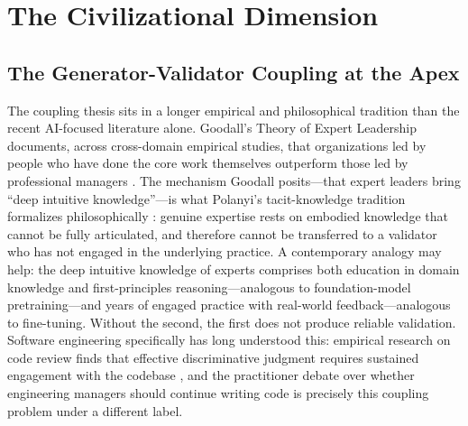 \documentclass[11pt,a4paper]{article}
\begin{document}
\section{The Civilizational Dimension}

\subsection{The Generator-Validator Coupling at the Apex}
The coupling thesis sits in a longer empirical and philosophical tradition than the recent AI-focused literature alone. Goodall's Theory of Expert Leadership documents, across cross-domain empirical studies, that organizations led by people who have done the core work themselves outperform those led by professional managers \citep{goodall2011}. The mechanism Goodall posits---that expert leaders bring ``deep intuitive knowledge''---is what Polanyi's tacit-knowledge tradition formalizes philosophically \citep{polanyi1966}: genuine expertise rests on embodied knowledge that cannot be fully articulated, and therefore cannot be transferred to a validator who has not engaged in the underlying practice. A contemporary analogy may help: the deep intuitive knowledge of experts comprises both education in domain knowledge and first-principles reasoning---analogous to foundation-model pretraining---and years of engaged practice with real-world feedback---analogous to fine-tuning. Without the second, the first does not produce reliable validation. Software engineering specifically has long understood this: empirical research on code review finds that effective discriminative judgment requires sustained engagement with the codebase \citep{bacchelli2013}, and the practitioner debate over whether engineering managers should continue writing code is precisely this coupling problem under a different label.
\end{document}
